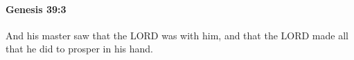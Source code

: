 
		\paragraph{Genesis 39:3} %
			\label{GENESIS-39-3}

			And his master saw that the LORD was with him, and that the LORD made all that he did to prosper in his hand.


